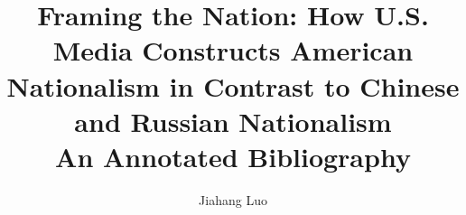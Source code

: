 \documentclass [11pt]{article}
\title{Framing the Nation: How U.S. Media Constructs American Nationalism in Contrast to Chinese and Russian Nationalism
\\\medskip An Annotated Bibliography}
\author{Jiahang Luo}
\begin{document}
\maketitle
\nocite{*}


\end{document}

